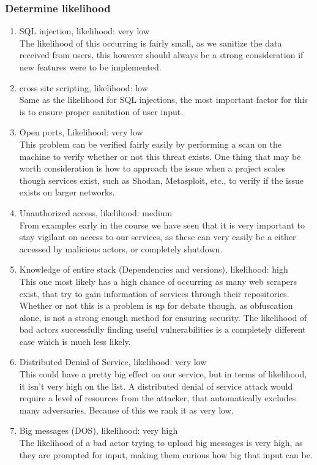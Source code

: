 \subsubsection{Determine likelihood}
\begin{enumerate}
    \item SQL injection, likelihood: very low\\
    The likelihood of this occurring is fairly small, as we sanitize the data received from users, this however should always be a strong consideration if new features were to be implemented.  
    \item cross site scripting, likelihood: low \\
    Same as the likelihood for SQL injections, the most important factor for this is to ensure proper sanitation of user input.
    \item Open ports, Likelihood: very low\\
    This problem can be verified fairly easily by performing a scan on the machine to verify whether or not this threat exists. One thing that may be worth consideration is how to approach the issue when a project scales though services exist, such as Shodan, Metasploit, etc., to verify if the issue exists on larger networks. 
    \item Unauthorized access, likelihood: medium\\
    From examples early in the course we have seen that it is very important to stay vigilant on access to our services, as these can very easily be a either accessed by malicious actors, or completely shutdown.
    \item Knowledge of entire stack (Dependencies and versions), likelihood: high\\
    This one most likely has a high chance of occurring as many web scrapers exist, that try to gain information of services through their repositories. Whether or not this is a problem is up for debate though, as obfuscation alone, is not a strong enough method for ensuring security. The likelihood of bad actors successfully finding useful vulnerabilities is a completely different case which is much less likely.
    \item Distributed Denial of Service, likelihood: very low \\
    This could have a pretty big effect on our service, but in terms of likelihood, it isn't very high on the list. A distributed denial of service attack would require a level of resources from the attacker, that automatically excludes many adversaries. Because of this we rank it as very low.
    \item Big messages (DOS), likelihood: very high\\
    The likelihood of a bad actor trying to upload big messages is very high, as they are prompted for input, making them curious how big that input can be.
\end{enumerate}


